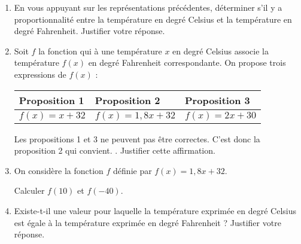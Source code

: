 \documentclass[10pt]{article}
\begin{document}
\medskip

\begin{enumerate}
\item En vous appuyant sur les représentations précédentes, déterminer s'il y a
proportionnalité entre la température en degré Celsius et la température en degré
Fahrenheit. Justifier votre réponse.
\item  Soit $f$ la fonction qui à une température $x$ en degré Celsius associe la température
$f(x)$ en degré Fahrenheit correspondante. On propose trois expressions de $f(x)$ :

\begin{center}
\begin{tabularx}{0.8\linewidth}{|*{3}{>{\centering \arraybackslash}X|}}\hline
Proposition 1 &Proposition 2& Proposition 3\\ \hline
$f(x) = x+32$& $f(x) = 1,8x + 32$& $f(x) = 2x + 30$\\ \hline
\end{tabularx}
\end{center}

\og Les propositions 1 et 3 ne peuvent pas être correctes. C'est donc la proposition 2 qui
convient. \fg. Justifier cette affirmation.
\item  On considère la fonction $f$ définie par $f(x) = 1,8x + 32$.

Calculer $f(10)$ et $f(-40)$.
\item  Existe-t-il une valeur pour laquelle la température exprimée en degré Celsius est égale
à la température exprimée en degré Fahrenheit ? Justifier votre réponse.
\end{enumerate}

\vspace{0,5cm}
\end{document}
